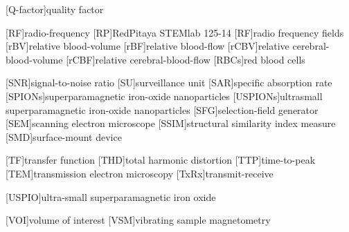 \begin{acronym}[ECU]
[Q-factor]{quality factor}

[RF]{radio-frequency}
[RP]{RedPitaya STEMlab 125-14}
[RF]{radio frequency fields}
[rBV]{relative blood-volume}
[rBF]{relative blood-flow}
[rCBV]{relative cerebral-blood-volume}
[rCBF]{relative cerebral-blood-flow}
[RBCs]{red blood cells}

[SNR]{signal-to-noise ratio}
[SU]{surveillance unit}
[SAR]{specific absorption rate}
[SPIONs]{superparamagnetic iron-oxide nanoparticles}
[USPIONs]{ultrasmall superparamagnetic iron-oxide nanoparticles}
[SFG]{selection-field generator}
[SEM]{scanning electron microscope}
[SSIM]{structural similarity index measure}
[SMD]{surface-mount device}

[TF]{transfer function}
[THD]{total harmonic distortion}
[TTP]{time-to-peak}
[TEM]{transmission electron microscopy}
[TxRx]{transmit-receive}

[USPIO]{ultra-small superparamagnetic iron oxide}

[VOI]{volume of interest}
[VSM]{vibrating sample magnetometry}

\end{acronym}

